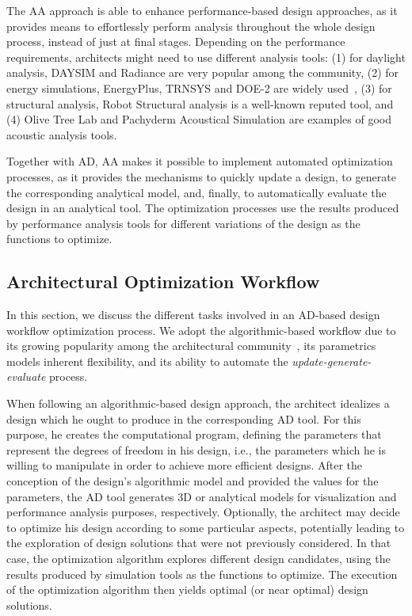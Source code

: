 	The \ac{AA} approach is able to enhance performance-based design approaches, as it provides means to effortlessly perform analysis throughout the whole design process, instead of just at final stages. Depending on the performance requirements, architects might need to use different analysis tools: (1) for daylight analysis, DAYSIM and Radiance are very popular among the community, (2) for energy simulations, EnergyPlus, TRNSYS and DOE-2 are widely used~\cite{Nguyen2014}, (3) for structural analysis, Robot Structural analysis is a well-known reputed tool, and (4) Olive Tree Lab and Pachyderm Acoustical Simulation are examples of good acoustic analysis tools. 

	Together with \ac{AD}, \ac{AA} makes it possible to implement automated optimization processes, as it provides the mechanisms to quickly update a design, to generate the corresponding analytical model, and, finally, to automatically evaluate the design in an analytical tool. The optimization processes use the results produced by performance analysis tools for different variations of the design as the functions to optimize. 
	
\subsection{Architectural Optimization Workflow}

In this section, we discuss the different tasks involved in an \ac{AD}-based design workflow optimization process. We adopt the algorithmic-based workflow due to its growing popularity among the architectural community~\cite{Kestelier2013}, its parametrics models inherent flexibility, and its ability to automate the \textit{update-generate-evaluate} process. 

	When following an algorithmic-based design approach, the architect idealizes a design which he ought to produce in the corresponding \ac{AD} tool. For this purpose, he creates the computational program, defining the parameters that represent the degrees of freedom in his design, i.e., the parameters which he is willing to manipulate in order to achieve more efficient designs. After the conception of the design's algorithmic model and provided the values for the parameters, the \ac{AD} tool generates 3D or analytical models for visualization and performance analysis purposes, respectively. Optionally, the architect may decide to optimize his design according to some particular aspects, potentially leading to the exploration of design solutions that were not previously considered. In that case, the optimization algorithm explores different design candidates, using the results produced by simulation tools as the functions to optimize. The execution of the optimization algorithm then yields optimal (or near optimal) design solutions.
	
